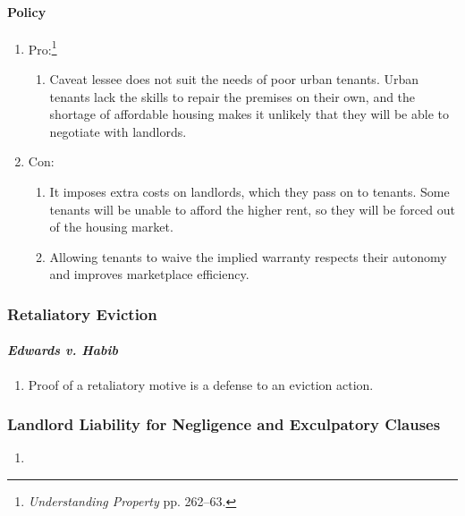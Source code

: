 \paragraph{Policy}

\begin{enumerate}
    \item Pro:\footnote{\emph{Understanding Property} pp. 262--63.}
    \begin{enumerate}
        \item Caveat lessee does not suit the needs of poor urban tenants. 
        Urban tenants lack the skills to repair the premises on their own, and 
        the shortage of affordable housing makes it unlikely that they will be 
        able to negotiate with landlords.
    \end{enumerate}
    \item Con:
    \begin{enumerate}
        \item It imposes extra costs on landlords, which they pass on to 
        tenants. Some tenants will be unable to afford the higher rent, so 
        they will be forced out of the housing market.
        \item Allowing tenants to waive the implied warranty respects their 
        autonomy and improves marketplace efficiency.
    \end{enumerate}
\end{enumerate}

\subsubsection{Retaliatory Eviction}

\paragraph{\emph{Edwards v. Habib}}

\begin{enumerate}
    \item Proof of a retaliatory motive is a defense to an eviction action.
\end{enumerate}

\subsubsection{Landlord Liability for Negligence and Exculpatory Clauses}

\begin{enumerate}
    \item
\end{enumerate}

